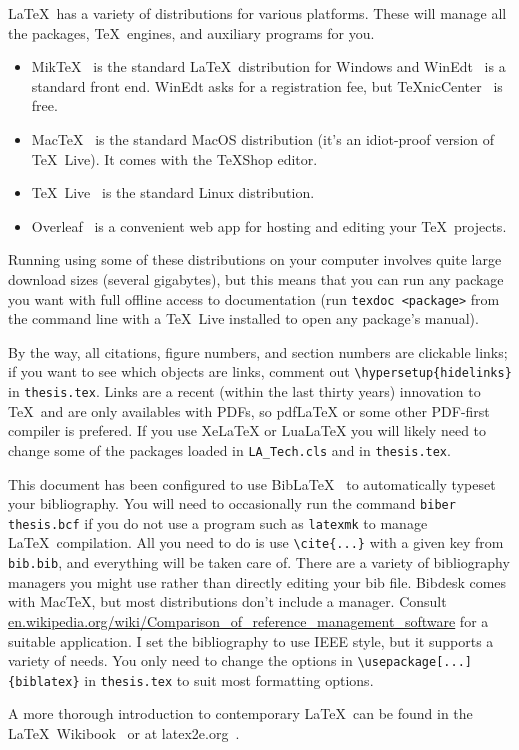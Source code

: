 \LaTeX\ has a variety of distributions for various platforms.
These will manage all the packages, \TeX\ engines, and auxiliary programs for you.
\begin{itemize}
	\item Mik\TeX~\cite{MiKTeX} is the standard \LaTeX\ distribution for Windows and WinEdt~\cite{WinEdt} is a standard front end.
	WinEdt asks for a registration fee, but \TeX nicCenter~\cite{TeXnicCenter} is free. 
	\item Mac\TeX~\cite{MacTeX} is the standard MacOS distribution (it's an idiot-proof version of \TeX\ Live).
	It comes with the \TeX Shop editor.
	\item \TeX\ Live~\cite{TeXLive} is the standard Linux distribution.
	\item Overleaf~\cite{overleaf} is a convenient web app for hosting and editing your \TeX\ projects.
\end{itemize}
Running using some of these distributions on your computer involves quite large download sizes (several gigabytes), but this means that you can run any package you want with full offline access to documentation (run \verb+texdoc <package>+ from the command line with a \TeX\ Live installed to open any package's manual).

By the way, all citations, figure numbers, and section numbers are clickable links; if you want to see which objects are links, comment out \verb+\hypersetup{hidelinks}+ in \verb+thesis.tex+.
Links are a recent (within the last thirty years) innovation to \TeX\ and are only availables with PDFs, so pdfLaTeX or some other PDF-first compiler is prefered.
If you use XeLaTeX or LuaLaTeX you will likely need to change some of the packages loaded in \verb+LA_Tech.cls+ and in \verb+thesis.tex+.

This document has been configured to use Bib\LaTeX~\cite{biblatex} to automatically typeset your bibliography.
You will need to occasionally run the command \verb+biber thesis.bcf+ if you do not use a program such as \verb+latexmk+ to manage \LaTeX\ compilation.
All you need to do is use \verb+\cite{...}+ with a given key from \verb+bib.bib+, and everything will be taken care of.
There are a variety of bibliography managers you might use rather than directly editing your bib file.
Bibdesk comes with Mac\TeX, but most distributions don't include a manager.
Consult \url{en.wikipedia.org/wiki/Comparison_of_reference_management_software} for a suitable application.
I set the bibliography to use IEEE style, but it supports a variety of needs.
You only need to change the options in \verb+\usepackage[...]{biblatex}+ in \verb+thesis.tex+ to suit most formatting options.

A more thorough introduction to contemporary \LaTeX\ can be found in the \LaTeX\ Wikibook~\cite{Wikibook} or at latex2e.org~\cite{latex2e}.
